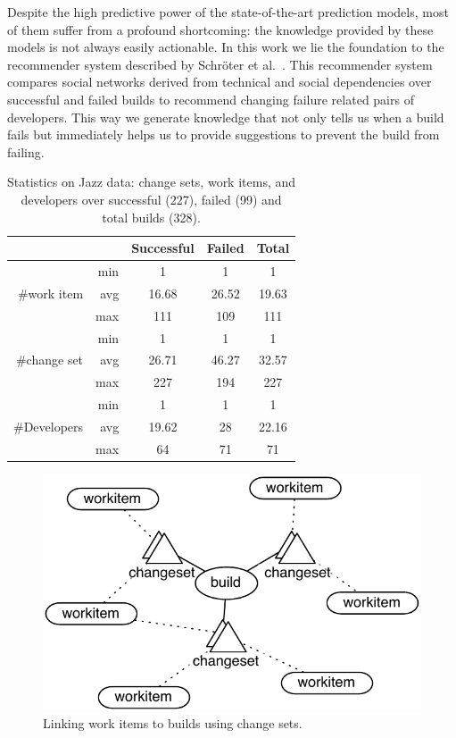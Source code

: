 \documentclass[12pt,oneside]{book}
\begin{document}
Despite the high predictive power of the state-of-the-art prediction models, most
of them suffer from a profound shortcoming: the knowledge provided by these
models is not always easily actionable. In this work we lie the foundation to
the recommender system described by Schr\"oter et
al.~\cite{schroeter:rsse:2008}. 
%
This recommender system compares social networks derived from technical and social dependencies over successful and failed builds to recommend changing failure related pairs of developers.
%
%
This way we generate knowledge that not only tells us when a build fails but immediately helps us to provide suggestions to prevent the build from failing.








\begin{table}[t]
\centering
\begin{tabular}{rrccc}
\toprule
& & Successful & Failed & Total\\
\midrule
&min &1&1&1\\
\#work item & avg  & 16.68&26.52&19.63\\
& max & 111&109&111\\
\midrule
& min & 1&1&1\\
\#change set & avg  & 26.71&46.27&32.57\\
& max & 227&194&227\\
\midrule
& min & 1&1&1\\
\#Developers & avg  & 19.62&28&22.16\\
& max &64&71&71\\
\bottomrule
\end{tabular}
\caption{Statistics on Jazz data: change sets, work items, 
and developers over successful (227), failed (99) and total builds (328).}
\label{tab:jazzbuildinfo}
\end{table}

\begin{figure}[b]
\centering
\includegraphics[width=.9\columnwidth]{figures/buildworkitem}
\caption{Linking work items to builds using change sets.}
\label{fig:buildtowork item}
\end{figure}
\end{document}
